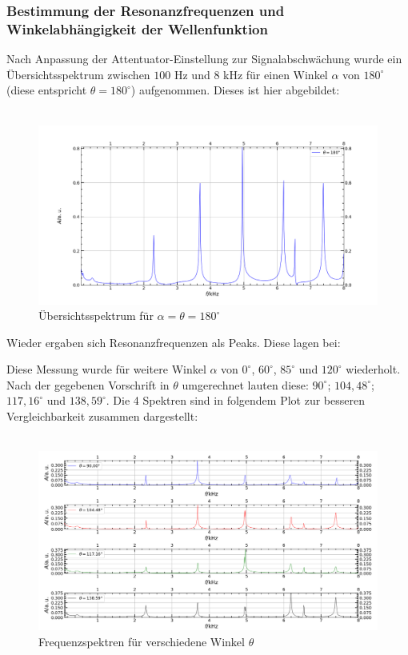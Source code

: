 \documentclass[german,  %
parskip=full,  %
]{scrartcl}
\begin{document}
\subsubsection{Bestimmung der Resonanzfrequenzen und Winkelabhängigkeit der Wellenfunktion}
Nach Anpassung der Attentuator-Einstellung zur Signalabschwächung wurde ein Übersichtsspektrum zwischen $100$ Hz und $8$ kHz für einen Winkel $\alpha$ von $180^{\circ}$ (diese entspricht $\theta = 180^{\circ}$) aufgenommen. Dieses ist hier abgebildet: \\\\
\begin{figure}[h!]
\centering
\includegraphics[width=\textwidth]{4311}
\caption{Übersichtsspektrum für $\alpha = \theta = 180^{\circ}$}
\end{figure}
Wieder ergaben sich Resonanzfrequenzen als Peaks. Diese lagen bei:

Diese Messung wurde für weitere Winkel $\alpha$ von  $0^{\circ}$, $60^{\circ}$, $85^{\circ}$ und $120^{\circ}$ wiederholt. Nach der gegebenen Vorschrift in $\theta$ umgerechnet lauten diese: $90^{\circ}$; $104,48^{\circ}$; $117,16^{\circ}$ und $138,59^{\circ}$. Die 4 Spektren sind in folgendem Plot zur besseren Vergleichbarkeit zusammen dargestellt: \\\\
\begin{figure}[h!]
\centering
\includegraphics[width=\textwidth]{4312}
\caption{Frequenzspektren für verschiedene Winkel $\theta$}
\end{figure}
\end{document}
